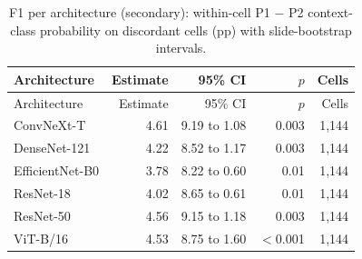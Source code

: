 {\footnotesize
\setlength{\tabcolsep}{3.5pt}
\begin{longtable}{lrrrr}
\caption{F1 per architecture (secondary): within-cell P1 $-$ P2 context-class probability on discordant cells (pp) with slide-bootstrap intervals.}\label{r:tab:cricarch}\\
\toprule
Architecture & Estimate & 95\% CI & $p$ & Cells \\
\midrule
\endfirsthead
\toprule
Architecture & Estimate & 95\% CI & $p$ & Cells \\
\midrule
\endhead
\bottomrule
\endfoot
ConvNeXt-T & \textminus{}4.61 & \textminus{}9.19 to \textminus{}1.08 & 0.003 & 1,144 \\
DenseNet-121 & \textminus{}4.22 & \textminus{}8.52 to \textminus{}1.17 & 0.003 & 1,144 \\
EfficientNet-B0 & \textminus{}3.78 & \textminus{}8.22 to \textminus{}0.60 & 0.01 & 1,144 \\
ResNet-18 & \textminus{}4.02 & \textminus{}8.65 to \textminus{}0.61 & 0.01 & 1,144 \\
ResNet-50 & \textminus{}4.56 & \textminus{}9.15 to \textminus{}1.18 & 0.003 & 1,144 \\
ViT-B/16 & \textminus{}4.53 & \textminus{}8.75 to \textminus{}1.60 & $<$0.001 & 1,144 \\
\end{longtable}
}
